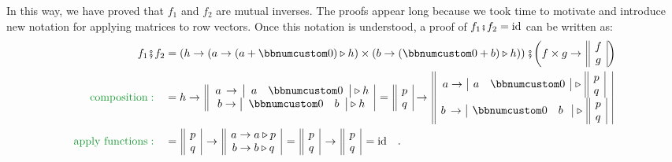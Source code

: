 In this way, we have proved that $f_{1}$ and $f_{2}$ are mutual
inverses. The proofs appear long because we took time to motivate
and introduce new notation for applying matrices to row vectors. Once
this notation is understood, a proof of $f_{1}\bef f_{2}=\text{id}$
can be written as:
\begin{align*}
f_{1}\bef f_{2} & =\left(h\rightarrow(a\rightarrow(a+\bbnum 0)\triangleright h)\times(b\rightarrow(\bbnum 0+b)\triangleright h)\right)\bef\bigg(f\times g\rightarrow\,\begin{array}{||c|}
f\\
g
\end{array}\bigg)\\
{\color{greenunder}\text{composition}:}\quad & =h\rightarrow\,\begin{array}{||c|}
\,a\,\rightarrow\,\left|\begin{array}{cc}
a & \bbnum 0\end{array}\right|\triangleright h\\
b\rightarrow\left|\begin{array}{cc}
\bbnum 0 & b\end{array}\right|\triangleright h
\end{array}\,=\,\begin{array}{||c|}
p\\
q
\end{array}\rightarrow\,\begin{array}{||c|}
a\rightarrow\,\begin{array}{|cc|}
a & \bbnum 0\end{array}\,\triangleright\,\begin{array}{||c|}
p\\
q
\end{array}\\
b\,\rightarrow\,\begin{array}{|cc|}
\bbnum 0 & b\,\,\end{array}\,\triangleright\,\begin{array}{||c|}
p\\
q
\end{array}
\end{array}\\
{\color{greenunder}\text{apply functions}:}\quad & =\,\begin{array}{||c|}
p\\
q
\end{array}\,\rightarrow\,\begin{array}{||c|}
a\rightarrow a\triangleright p\\
b\rightarrow b\triangleright q
\end{array}\,=\,\begin{array}{||c|}
p\\
q
\end{array}\,\rightarrow\,\begin{array}{||c|}
p\\
q
\end{array}\,=\text{id}\quad.
\end{align*}
